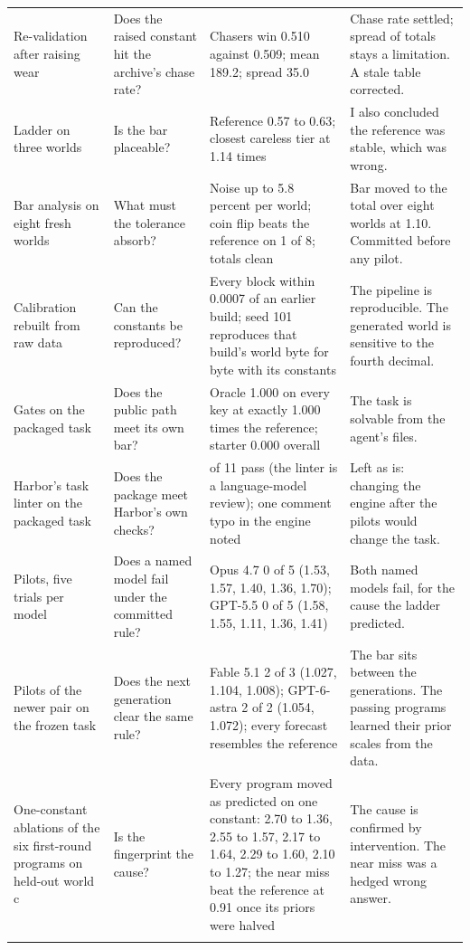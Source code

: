 \documentclass[11pt,letterpaper]{article}
\begin{document}
\begin{small}
\begin{longtable}{>{\raggedright\arraybackslash}p{}>{\raggedright\arraybackslash}p{}>{\raggedright\arraybackslash}p{}>{\raggedright\arraybackslash}p{}}
Re-validation after raising wear & Does the raised constant hit the archive's chase rate? & Chasers win 0.510 against 0.509; mean 189.2; spread 35.0 & Chase rate settled; spread of totals stays a limitation. A stale table corrected. \\ \addlinespace[2pt]
Ladder on three worlds & Is the bar placeable? & Reference 0.57 to 0.63; closest careless tier at 1.14 times & I also concluded the reference was stable, which was wrong. \\ \addlinespace[2pt]
Bar analysis on eight fresh worlds & What must the tolerance absorb? & Noise up to 5.8 percent per world; coin flip beats the reference on 1 of 8; totals clean & Bar moved to the total over eight worlds at 1.10. Committed before any pilot. \\ \addlinespace[2pt]
Calibration rebuilt from raw data & Can the constants be reproduced? & Every block within 0.0007 of an earlier build; seed 101 reproduces that build's world byte for byte with its constants & The pipeline is reproducible. The generated world is sensitive to the fourth decimal. \\ \addlinespace[2pt]
Gates on the packaged task & Does the public path meet its own bar? & Oracle 1.000 on every key at exactly 1.000 times the reference; starter 0.000 overall & The task is solvable from the agent's files. \\ \addlinespace[2pt]
Harbor's task linter on the packaged task & Does the package meet Harbor's own checks? & 11 of 11 pass (the linter is a language-model review); one comment typo in the engine noted & Left as is: changing the engine after the pilots would change the task. \\ \addlinespace[2pt]
Pilots, five trials per model & Does a named model fail under the committed rule? & Opus 4.7 0 of 5 (1.53, 1.57, 1.40, 1.36, 1.70); GPT-5.5 0 of 5 (1.58, 1.55, 1.11, 1.36, 1.41) & Both named models fail, for the cause the ladder predicted. \\ \addlinespace[2pt]
Pilots of the newer pair on the frozen task & Does the next generation clear the same rule? & Fable 5.1 2 of 3 (1.027, 1.104, 1.008); GPT-6-astra 2 of 2 (1.054, 1.072); every forecast resembles the reference & The bar sits between the generations. The passing programs learned their prior scales from the data. \\ \addlinespace[2pt]
One-constant ablations of the six first-round programs on held-out world c & Is the fingerprint the cause? & Every program moved as predicted on one constant: 2.70 to 1.36, 2.55 to 1.57, 2.17 to 1.64, 2.29 to 1.60, 2.10 to 1.27; the near miss beat the reference at 0.91 once its priors were halved & The cause is confirmed by intervention. The near miss was a hedged wrong answer. \\ \addlinespace[2pt]
\end{longtable}
\end{small}
\end{document}
